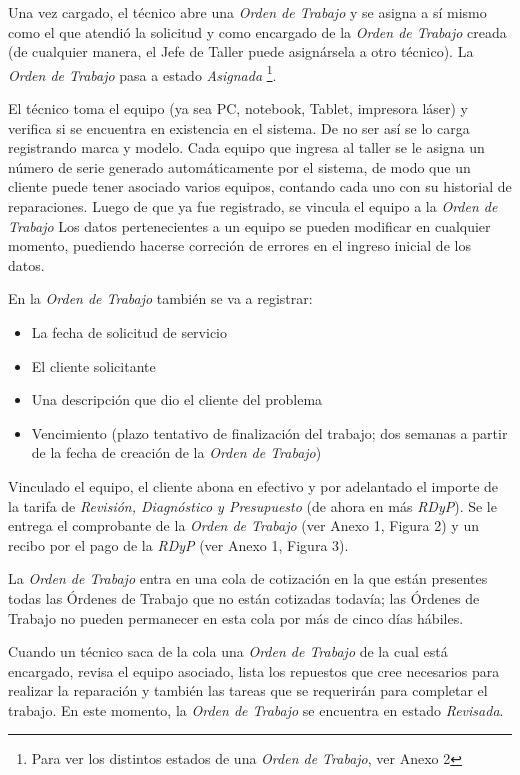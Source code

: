 \documentclass[12pt]{extarticle}
\begin{document}
\begin{spacing}{1.2}
    Una vez cargado, el técnico abre una \textit{Orden de Trabajo} y se asigna a sí mismo como el que atendió la solicitud y como encargado de la \textit{Orden de Trabajo} creada (de cualquier manera, el Jefe de Taller puede asignársela a otro técnico). La \textit{Orden de Trabajo} pasa a estado \textit{Asignada} \footnote{Para ver los distintos estados de una \textit{Orden de Trabajo}, ver Anexo 2}. 

    El técnico toma el equipo (ya sea PC, notebook, Tablet, impresora láser) y verifica si se encuentra en existencia en el sistema. De no ser así se lo carga registrando marca y modelo. Cada equipo que ingresa al taller se le asigna un número de serie generado automáticamente por el sistema, de modo que un cliente puede tener asociado varios equipos, contando cada uno con su historial de reparaciones. Luego de que ya fue registrado, se vincula el equipo a la \textit{Orden de Trabajo}
    Los datos pertenecientes a un equipo se pueden modificar en cualquier momento, puediendo hacerse correción de errores en el ingreso inicial de los datos.
   
    En la \textit{Orden de Trabajo} también se va a registrar:
    \begin{itemize}
        \item La fecha de solicitud de servicio
        \item El cliente solicitante
        \item Una descripción que dio el cliente del problema
        \item Vencimiento (plazo tentativo de finalización del trabajo; dos semanas a partir de la fecha de creación de la \textit{Orden de Trabajo})
    \end{itemize}

    Vinculado el equipo, el cliente abona en efectivo y por adelantado el importe de la tarifa de \textit{Revisión, Diagnóstico y Presupuesto} (de ahora en más \textit{RDyP}). Se le entrega el comprobante de la \textit{Orden de Trabajo} (ver Anexo 1, Figura 2) y un recibo por el pago de la \textit{RDyP} (ver Anexo 1, Figura 3). 

    La \textit{Orden de Trabajo} entra en una cola de cotización en la que están presentes todas las Órdenes de Trabajo que no están cotizadas todavía; las Órdenes de Trabajo no pueden permanecer en esta cola por más de cinco días hábiles.
    
    Cuando un técnico saca de la cola una \textit{Orden de Trabajo} de la cual está encargado, revisa el equipo asociado, lista los repuestos que cree necesarios para realizar la reparación y también las tareas que se requerirán para completar el trabajo. En este momento, la \textit{Orden de Trabajo} se encuentra en estado \textit{Revisada}.


\end{spacing}
\end{document}
